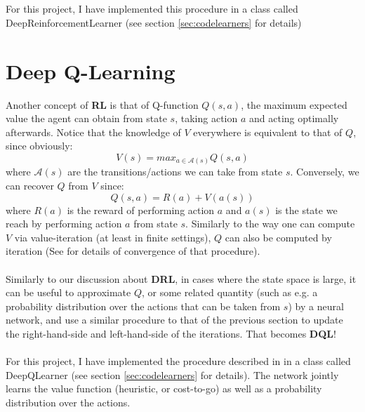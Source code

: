 \\
\\
For this project, I have implemented this procedure in a class called DeepReinforcementLearner (see section \ref{sec:codelearners} for details)



\section{Deep Q-Learning}

Another concept of \textbf{RL} is that of Q-function $Q(s, a)$, the maximum expected value the agent can obtain from state $s$, taking action $a$ and acting optimally afterwards. Notice that the knowledge of $V$ everywhere is equivalent to that of $Q$, since obviously:
\begin{equation} \label{eq:QI}
V(s) = max_{a \in \mathcal{A}(s)} Q(s, a)
\end{equation}
where $\mathcal{A}(s)$ are the transitions/actions we can take from state $s$. Conversely, we can recover $Q$ from $V$ since:
\begin{equation} \label{eq:QI2}
Q(s, a) = R(a) + V(a(s))
\end{equation}
where $R(a)$ is the reward of performing action $a$ and $a(s)$ is the state we reach by performing action $a$ from state $s$. Similarly to the way one can compute $V$ via value-iteration (at least in finite settings), $Q$ can also be computed by iteration (See \cite{Watkins1992} for details of convergence of that procedure).
\\
\\
Similarly to our discussion about \textbf{DRL}, in cases where the state space is large, it can be useful to approximate $Q$, or some related quantity (such as e.g. a probability distribution over the actions that can be taken from $s$) by a neural network, and use a similar procedure to that of the previous section to update the right-hand-side and left-hand-side of the iterations. That becomes \textbf{DQL}!
\\
\\
For this project, I have implemented the procedure described in \cite{https://doi.org/10.48550/arxiv.1805.07470} in a class called DeepQLearner (see section \ref{sec:codelearners} for details). The network jointly learns the value function (heuristic, or cost-to-go) as well as a probability distribution over the actions.


